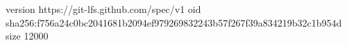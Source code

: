 version https://git-lfs.github.com/spec/v1
oid sha256:f756a24c0bc2041681b2094ef979269832243b57f267f39a834219b32c1b954d
size 12000
